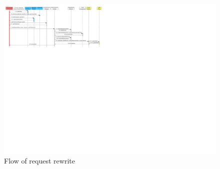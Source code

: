 \begin{figure}
    \centering
    \includegraphics[width=1.0\textwidth]{images/architecture/InteractionDiagram-Rewrite-Flow-PePSA.pdf}
    \caption{Flow of \middleware{} request rewrite}
    \label{fig:pepsa-sequence}
\end{figure}